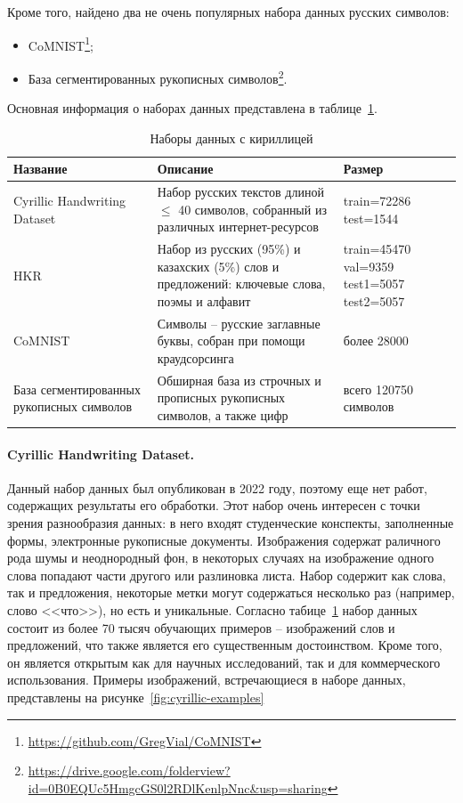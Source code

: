 Кроме того, найдено два не очень популярных набора данных русских символов:
\begin{itemize}
    \item CoMNIST\footnote{\url{https://github.com/GregVial/CoMNIST}};
    \item База сегментированных рукописных символов\footnote{\url{https://drive.google.com/folderview?id=0B0EQUc5HmgcGS0l2RDlKenlpNnc&usp=sharing}}.
\end{itemize}

Основная информация о наборах данных представлена в таблице~\ref{tab:datasets}.

\begin{table}[h!]
    \centering
    \begin{tabular}{|p{4cm}|p{7cm}|p{3cm}|}
        \hline
        \textbf{Название} & \textbf{Описание} & \textbf{Размер} \\
        \hline
        \hline
        Cyrillic Handwriting Dataset & Набор русских текстов длиной $\leqslant$ 40 символов, собранный из различных интернет-ресурсов & train=72286 test=1544 \\
        \hline
        HKR~\cite{nurseitov2021handwritten} & Набор из русских (95\%) и казахских (5\%) слов и предложений: ключевые слова, поэмы и алфавит & train=45470 val=9359 test1=5057 test2=5057 \\
        \hline
        CoMNIST & Символы -- русские заглавные буквы, собран при помощи краудсорсинга & более 28000 \\
        \hline
        База сегментированных рукописных символов & Обширная база из строчных и прописных рукописных символов, а также цифр & всего 120750 символов \\
        \hline
    \end{tabular}
    \caption{Наборы данных с кириллицей}
    \label{tab:datasets}
\end{table}

\paragraph{Cyrillic Handwriting Dataset.}{Данный набор данных был опубликован в 2022 году, поэтому еще нет работ, содержащих результаты его обработки.
Этот набор очень интересен с точки зрения разнообразия данных: в него входят студенческие конспекты, заполненные формы, электронные рукописные документы.
Изображения содержат раличного рода шумы и неоднородный фон, в некоторых случаях на изображение одного слова попадают части другого или разлиновка листа.
Набор содержит как слова, так и предложения, некоторые метки могут содержаться несколько раз (например, слово <<что>>), но есть и уникальные.
Согласно табице~\ref{tab:datasets} набор данных состоит из более 70 тысяч обучающих примеров -- изображений слов и предложений, что также является его существенным достоинством.
Кроме того, он является открытым как для научных исследований, так и для коммерческого использования.
Примеры изображений, встречающиеся в наборе данных, представлены на рисунке~\ref{fig:cyrillic-examples}}

